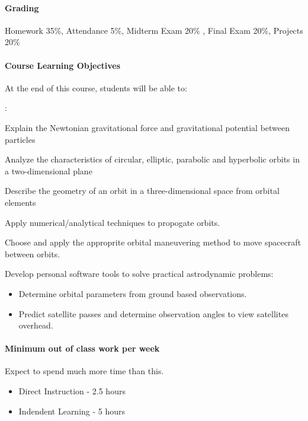 \documentclass[10pt]{article}
\begin{document}
\paragraph*{Grading}
Homework 35\%,\;\; Attendance 5\%,\;\; Midterm Exam 20\% ,\;\; Final Exam 20\%, \;\; Projects 20\%


\paragraph*{Course Learning Objectives}
At the end of this course, students will be able to:

\begin{list}
{:}
{\setlength{\itemsep}{-3pt}}
\item Explain the Newtonian gravitational force and gravitational potential between particles
\item Analyze the characteristics of circular, elliptic, parabolic and hyperbolic orbits in a two-dimensional plane
\item Describe the geometry of an orbit in a three-dimensional space from orbital elements
\item Apply numerical/analytical techniques to propogate orbits.
\item Choose and apply the approprite orbital maneuvering method to move spacecraft between orbits.
\item Develop personal software tools to solve practical astrodynamic problems:
    \begin{itemize}
        \item Determine orbital parameters from ground based observations.
        \item Predict satellite passes and determine observation angles to view satellites overhead.
    \end{itemize}
\end{list}


\paragraph*{ Minimum out of class work per week} Expect to spend much more time than this.
\begin{itemize}
    \item Direct Instruction - 2.5 hours
    \item Indendent Learning - 5 hours
\end{itemize}
\end{document}
